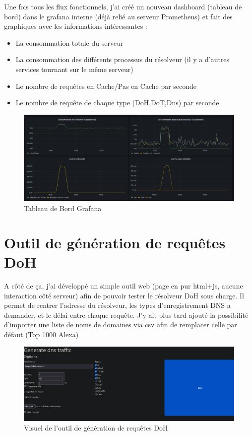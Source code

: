 Une fois tous les flux fonctionnels, j’ai créé un nouveau dashboard (tableau de bord) dans le grafana interne (déjà relié au serveur Prometheus) et fait des graphiques avec les informations intéressantes :

\begin{itemize}
    \item La consommation totale du serveur
    \item La consommation des différents processus du résolveur (il y a d’autres services tournant sur le même serveur)
    \item Le nombre de requêtes en Cache/Pas en Cache par seconde
    \item Le nombre de requête de chaque type (DoH,DoT,Dns) par seconde
\end{itemize}

\begin{figure}[htbp]
  \centering
  \includegraphics[width=\textwidth]{paper/figures/grafanaDNS.png}
  \caption{Tableau de Bord Grafana}
  \label{fig:grafanaDNS}
\end{figure}


\section{Outil de génération de requêtes DoH}
A côté de ça, j’ai développé un simple outil web (page en pur html+js, aucune interaction côté serveur) afin de pouvoir tester le résolveur DoH sous charge.
Il permet de rentrer l’adresse du résolveur, les types d’enregistrement DNS a demander, et le délai entre chaque requête. J’y ait plus tard ajouté la possibilité d’importer une liste de noms de domaines via csv afin de remplacer celle par défaut (Top 1000 Alexa) 

\begin{figure}[htbp]
  \centering
  \includegraphics[width=\textwidth]{paper/figures/outilDoh.png}
  \caption{Visuel de l'outil de génération de requêtes DoH}
  \label{fig:outilDoh}
\end{figure}


